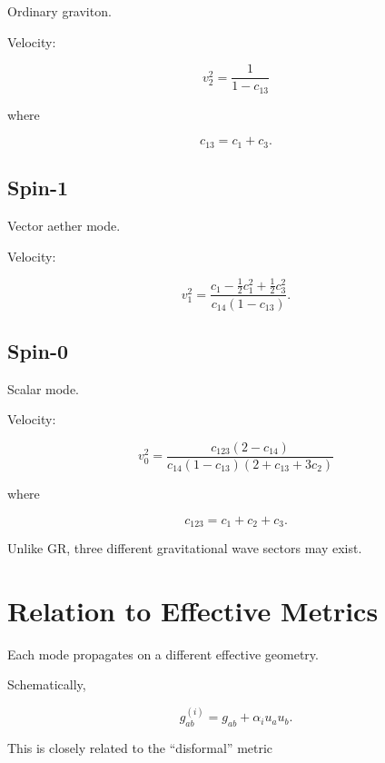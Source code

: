 Ordinary graviton.

Velocity:

\begin{equation}
v_2^2
=
\frac{1}{1-c_{13}}
\end{equation}

where

\begin{equation}
c_{13}=c_1+c_3.
\end{equation}

\subsection{Spin-1}

Vector aether mode.

Velocity:

\begin{equation}
v_1^2
=
\frac{
c_1-\frac12 c_1^2+\frac12 c_3^2
}
{
c_{14}(1-c_{13})
}.
\end{equation}

\subsection{Spin-0}

Scalar mode.

Velocity:

\begin{equation}
v_0^2
=
\frac{
c_{123}(2-c_{14})
}{
c_{14}(1-c_{13})(2+c_{13}+3c_2)
}
\end{equation}

where

\begin{equation}
c_{123}=c_1+c_2+c_3.
\end{equation}

Unlike GR, three different gravitational wave sectors may exist.

\section{Relation to Effective Metrics}

Each mode propagates on a different effective geometry.

Schematically,

\begin{equation}
g^{(i)}_{ab}
=
g_{ab}
+
\alpha_i u_a u_b .
\end{equation}

This is closely related to the ``disformal'' metric

